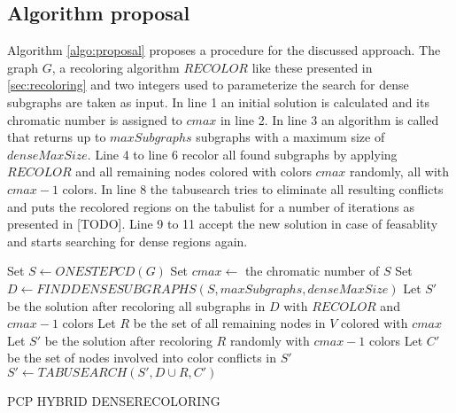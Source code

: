 \subsection{Algorithm proposal}
Algorithm \ref{algo:proposal} proposes a procedure for the discussed approach. The graph $G$, a recoloring algorithm $RECOLOR$ like these presented in \ref{sec:recoloring} and two integers used to parameterize the search for dense subgraphs are taken as input. In line 1 an initial solution is calculated and its chromatic number is assigned to $cmax$ in line 2. In line 3 an algorithm is called that returns up to $maxSubgraphs$ subgraphs with a maximum size of $denseMaxSize$. Line 4 to line 6 recolor all found subgraphs by applying $RECOLOR$ and all remaining nodes colored with colors $cmax$ randomly, all with $cmax-1$ colors. In line 8 the tabusearch tries to eliminate all resulting conflicts and puts the recolored regions on the tabulist for a number of iterations as presented in [TODO]. Line 9 to 11 accept the new solution in case of feasablity and starts searching for dense regions again.

\begin{algorithm}
Set $S \gets ONESTEPCD(G)$\;
Set $cmax \gets$ the chromatic number of $S$\;
Set $D \gets FINDDENSESUBGRAPHS( S, maxSubgraphs, denseMaxSize) $\;
Let $S'$ be the solution after recoloring all subgraphs in $D$ with $RECOLOR$ and $cmax-1$ colors\;
Let $R$ be the set of all remaining nodes in $V$ colored with $cmax$\;
Let $S'$ be the solution after recoloring $R$ randomly with $cmax-1$ colors\;
Let $C'$ be the set of nodes involved into color conflicts in $S'$\;
$S' \gets TABUSEARCH(S', D \cup R, C')$\;
\;
\caption{PCP HYBRID DENSERECOLORING}
\label{algo:proposal}
\end{algorithm}




